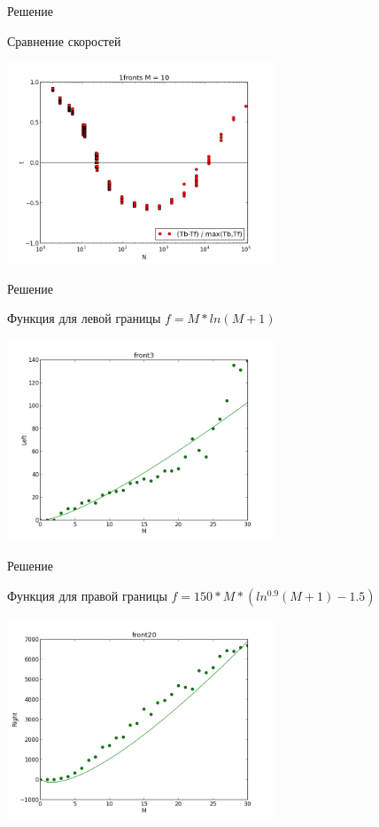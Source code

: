 \documentclass{beamer}
\begin{document}
\begin{frame}{Решение}
\begin{block}{Сравнение скоростей}
\begin{center}
\includegraphics*[height=6cm]{pic/bos_fast.png}
\end{center}
\end{block}
\end{frame}


\begin{frame}{Решение}
\begin{block}{Функция для левой границы}
$f = M * ln(M + 1)$
\begin{center}
\includegraphics*[height=6cm]{pic/left.png}
\end{center}

\end{block}
\end{frame}


\begin{frame}{Решение}
\begin{block}{Функция для правой границы}
$f = 150 * M * (ln^{0.9}(M + 1) - 1.5)$
\begin{center}
\includegraphics*[height=6cm]{pic/right.png}
\end{center}
\end{block}
\end{frame}
\end{document}
